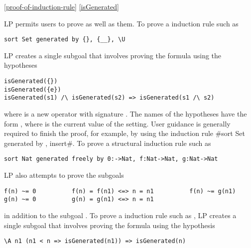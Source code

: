 \ref{proof-of-induction-rule}
\ref{isGenerated}

LP permits users to prove  as well as
 them.  To prove a  induction rule 
such as
\begin{verbatim}
sort Set generated by {}, {__}, \U
\end{verbatim}
LP creates a single subgoal that involves proving the formula
 using the hypotheses
\begin{verbatim}
isGenerated({})
isGenerated({e})
isGenerated(s1) /\ isGenerated(s2) => isGenerated(s1 /\ s2)
\end{verbatim}
where  is a new operator with signature .  The
names of the hypotheses have the form , where
 is the current value of the  setting.  User
guidance is generally required to finish the proof, for example, by using the
induction rule \fq#sort Set generated by {}, insert#.
\p
To prove a structural induction rule such as
\begin{verbatim}
sort Nat generated freely by 0:->Nat, f:Nat->Nat, g:Nat->Nat
\end{verbatim}
LP also attempts to prove the subgoals
\begin{verbatim}
f(n) ~= 0          f(n) = f(n1) <=> n = n1          f(n) ~= g(n1)
g(n) ~= 0          g(n) = g(n1) <=> n = n1
\end{verbatim}
in addition to the subgoal .
\p
To prove a  induction rule such as 
, LP creates a single subgoal that involves proving the 
formula
 using the hypothesis
\begin{verbatim}
\A n1 (n1 < n => isGenerated(n1)) => isGenerated(n)
\end{verbatim}
